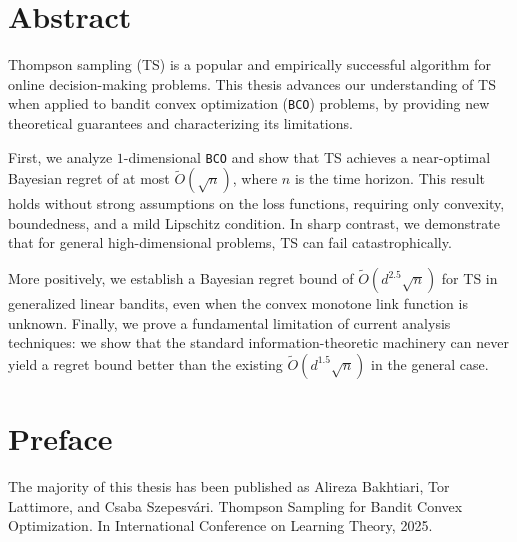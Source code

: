 \documentclass[letter, 12pt]{report}
\newcommand{\1}{\mathbf{1}}
\newcommand{\bco}{\texttt{BCO}\xspace}
\newcommand{\ts}{\textsc{TS}\xspace}
\theoremstyle{plain}
\theoremstyle{definition}
\theoremstyle{remark}
\begin{document}
\setcounter{page}{1}
\renewcommand{\thepage}{\roman{page}} %


\doublespacing

\chapter*{Abstract}
Thompson sampling (\ts) is a popular and empirically successful algorithm for online decision-making problems.
This thesis advances our understanding of \ts when applied to bandit convex optimization (\bco) problems,
by providing new theoretical guarantees and characterizing its limitations.

First, we analyze $1$-dimensional \bco and show that \ts achieves a near-optimal Bayesian regret of at most $\tilde O(\sqrt{n})$, where $n$ is the time horizon.
This result holds without strong assumptions on the loss functions, requiring only convexity, boundedness, and a mild Lipschitz condition.
In sharp contrast, we demonstrate that for general high-dimensional problems, \ts can fail catastrophically.

More positively, we establish a Bayesian regret bound of $\tilde O(d^{2.5} \sqrt{n})$ for \ts in generalized linear bandits, even when the convex monotone link function is unknown.
Finally, we prove a fundamental limitation of current analysis techniques: we show that the standard information-theoretic machinery can never yield a regret bound better than the existing $\tilde O(d^{1.5} \sqrt{n})$ in the general case.

\setcounter{page}{2}
\renewcommand{\thepage}{\roman{page}} %

\onehalfspacing
\chapter*{Preface} 
The majority of this thesis has been published as Alireza Bakhtiari,
Tor Lattimore, and Csaba Szepesv\'ari.
Thompson Sampling for Bandit Convex Optimization.
In International Conference on Learning Theory, 2025.
\end{document}
